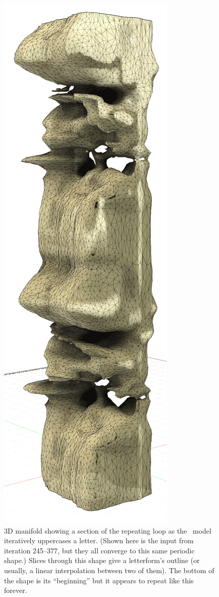\documentclass[twocolumn]{article}
\begin{document}
\begin{figure}[t]
\centering
  \includegraphics[width=0.7 \linewidth]{uppestcase3d}
\caption{ 3D manifold showing a section of the repeating loop as the
  \makeuppercase\ model iteratively uppercases a letter. (Shown here
  is the input  from iteration 245--377, but they all
  converge to this same periodic shape.) Slices through this shape give a
  letterform's outline (or usually, a linear interpolation between two
  of them). The bottom of the shape is its ``beginning'' but it
  appears to repeat like this forever.
} \label{fig:uppestcase3d}
\end{figure}
\end{document}
